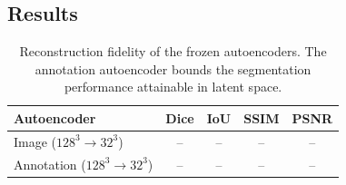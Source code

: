 \subsection{Results}
\label{subsec:results}

\begin{table}[t]
    \centering
    \caption{Reconstruction fidelity of the frozen autoencoders. The
    annotation autoencoder bounds the segmentation performance attainable in
    latent space.}
    \label{tab:autoencoder}
    \begin{tabular}{lcccc}
        \toprule
        Autoencoder & Dice & IoU & SSIM & PSNR \\
        \midrule
        Image ($128^{3} \to 32^{3}$)      & --   & --   & --   & --   \\
        Annotation ($128^{3} \to 32^{3}$) & --   & --   & --   & --   \\
        \bottomrule
    \end{tabular}
\end{table}

